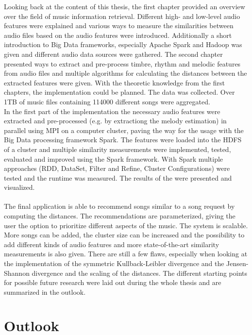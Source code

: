 Looking back at the content of this thesis, the first chapter provided an overview over the field of music information retrieval. Different high- and low-level audio features were explained and various ways to measure the similarities between audio files based on the audio features were introduced. Additionally a short introduction to Big Data frameworks, especially Apache Spark and Hadoop was given and different audio data sources were gathered. The second chapter presented ways to extract and pre-process timbre, rhythm and melodic features from audio files and multiple algorithms for calculating the distances between the extracted features were given. With the theoretic knowledge from the first chapters, the implementation could be planned. The data was collected. Over 1TB of music files containing 114000 different songs were aggregated.\\ 
In the first part of the implementation the necessary audio features were extracted and pre-processed (e.g. by extractiong the melody estimation) in parallel using MPI on a computer cluster, paving the way for the usage with the Big Data processing framework Spark.
The features were loaded into the HDFS of a cluster and multiple similarity measurements were implemented, tested, evaluated and improved using the Spark framework. With Spark multiple approaches (RDD, DataSet, Filter and Refine, Cluster Configurations) were tested and the runtime was measured. The results of the were presented and visualized.\\
\ \\
The final application is able to recommend songs similar to a song request by computing the distances. The recommendations are parameterized, giving the user the option to prioritize different aspects of the music. The system is scalable. More songs can be added, the cluster size can be increased and the possibility to add different kinds of audio features and more state-of-the-art similarity measurements is also given. There are still a few flaws, especially when looking at the implementation of the symmetric Kullback-Leibler divergence and the Jensen-Shannon divergence and the scaling of the distances. The different starting points for possible future research were laid out during the whole thesis and are summarized in the outlook. 

\section{Outlook}

